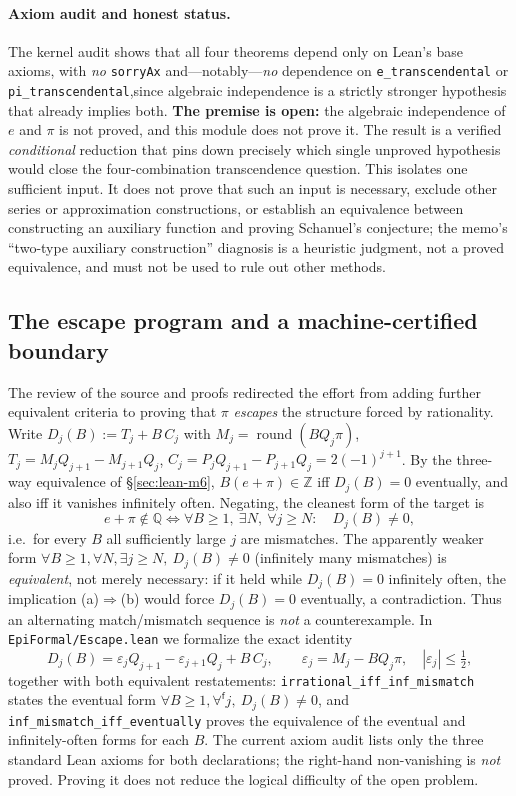\documentclass[11pt]{amsart}
\theoremstyle{definition}
\theoremstyle{remark}
\numberwithin{equation}{section}
\newcommand{\Q}{\mathbb{Q}}
\newcommand{\Z}{\mathbb{Z}}
\begin{document}
\paragraph{Axiom audit and honest status.} The kernel audit shows that all four theorems depend only on Lean's base axioms, with \emph{no} \texttt{sorryAx} and---notably---\emph{no} dependence on \texttt{e\_\allowbreak{}transcendental} or \texttt{pi\_\allowbreak{}transcendental},\allowbreak  since algebraic independence is a strictly stronger hypothesis that already implies both. \textbf{The premise is open:} the algebraic independence of $e$ and $\pi$ is not proved, and this module does not prove it. The result is a verified \emph{conditional} reduction that pins down precisely which single unproved hypothesis would close the four-combination transcendence question. This isolates one sufficient input. It does not prove that such an input is necessary, exclude other series or approximation constructions, or establish an equivalence between constructing an auxiliary function and proving Schanuel's conjecture; the memo's ``two-type auxiliary construction'' diagnosis is a heuristic judgment, not a proved equivalence, and must not be used to rule out other methods.

\subsection{The escape program and a machine-certified boundary}\label{sec:lean-escape}

The review of the source and proofs redirected the effort from adding further equivalent criteria to proving that $\pi$ \emph{escapes} the structure forced by rationality. Write $D_j(B):=T_j+B\,C_j$ with $M_j=\operatorname{round}(BQ_j\pi)$, $T_j=M_jQ_{j+1}-M_{j+1}Q_j$, $C_j=P_jQ_{j+1}-P_{j+1}Q_j=2(-1)^{j+1}$. By the three-way equivalence of \S\ref{sec:lean-m6}, $B(e+\pi)\in\Z$ iff $D_j(B)=0$ eventually, and also iff it vanishes infinitely often. Negating, the cleanest form of the target is
\[
e+\pi\notin\Q \iff \forall B\ge1,\ \exists N,\ \forall j\ge N:\quad D_j(B)\neq0,
\]
i.e.\ for every $B$ all sufficiently large $j$ are mismatches. The apparently weaker form $\forall B\ge1,\forall N,\exists j\ge N,\ D_j(B)\neq0$ (infinitely many mismatches) is \emph{equivalent}, not merely necessary: if it held while $D_j(B)=0$ infinitely often, the implication (a)$\Rightarrow$(b) would force $D_j(B)=0$ eventually, a contradiction. Thus an alternating match/mismatch sequence is \emph{not} a counterexample. In \texttt{EpiFormal/\allowbreak{}Escape.lean} we formalize the exact identity
\[
D_j(B)=\varepsilon_j Q_{j+1}-\varepsilon_{j+1}Q_j+B\,C_j,\qquad \varepsilon_j=M_j-BQ_j\pi,\quad|\varepsilon_j|\le\tfrac12,
\]
together with both equivalent restatements: \texttt{irrational\_iff\_inf\_mismatch} states the eventual form $\forall B\ge1,\forall^{\mathsf f}j,\ D_j(B)\neq0$, and \texttt{inf\_mismatch\_iff\_eventually} proves the equivalence of the eventual and infinitely-often forms for each $B$. The current axiom audit lists only the three standard Lean axioms for both declarations; the right-hand non-vanishing is \emph{not} proved. Proving it does not reduce the logical difficulty of the open problem.
\end{document}
